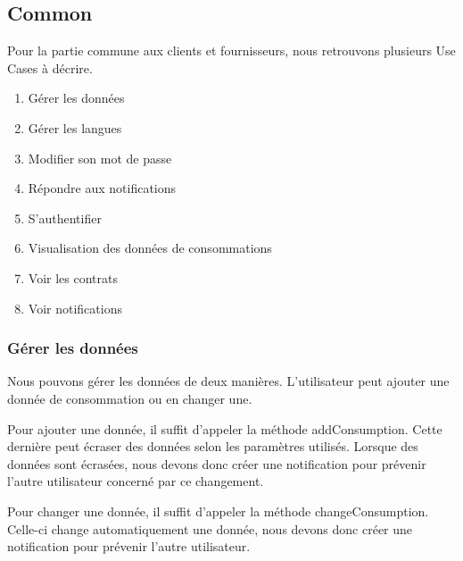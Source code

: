 \newpage
\subsection{Common}

\begin{flushleft}
Pour la partie commune aux clients et fournisseurs, nous retrouvons plusieurs Use Cases à décrire.
\end{flushleft}

\begin{enumerate}
\item Gérer les données
\item Gérer les langues
\item Modifier son mot de passe
\item Répondre aux notifications
\item S'authentifier
\item Visualisation des données de consommations
\item Voir les contrats
\item Voir notifications
\end{enumerate}

\newpage
\subsubsection{Gérer les données}

\begin{flushleft}
Nous pouvons gérer les données de deux manières. L'utilisateur peut ajouter une donnée de consommation ou en changer une.
\end{flushleft}

\begin{flushleft}
Pour ajouter une donnée, il suffit d'appeler la méthode addConsumption. Cette dernière peut écraser des données selon les paramètres utilisés. Lorsque des données sont écrasées, nous devons donc créer une notification pour prévenir l'autre utilisateur concerné par ce changement.
\end{flushleft}

\begin{flushleft}
Pour changer une donnée, il suffit d'appeler la méthode changeConsumption. Celle-ci change automatiquement une donnée, nous devons donc créer une notification pour prévenir l'autre utilisateur.
\end{flushleft}

